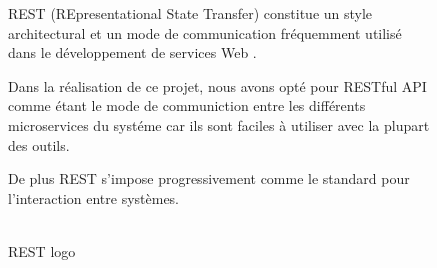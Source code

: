 \begin{itemize}
\begin{figure}[!htb]
\begin{minipage}{0.30\textwidth}
            \caption{\\ REST logo \cite{rest}}\label{Fig:Data1}
        \end{minipage}
        \begin{minipage}{0.60\textwidth}
            \par REST (REpresentational State Transfer) constitue un style architectural et un mode de communication fréquemment utilisé dans le développement de services Web \cite{rest}. \\
            \par Dans la réalisation de ce projet, nous avons opté pour RESTful API comme étant le mode de communiction entre les différents microservices du systéme car ils sont faciles à utiliser avec la plupart des outils. 
            \par De plus REST s'impose progressivement comme le standard pour l'interaction entre systèmes. 
          
        \end{minipage}
    \end{figure}

    \end{itemize}

